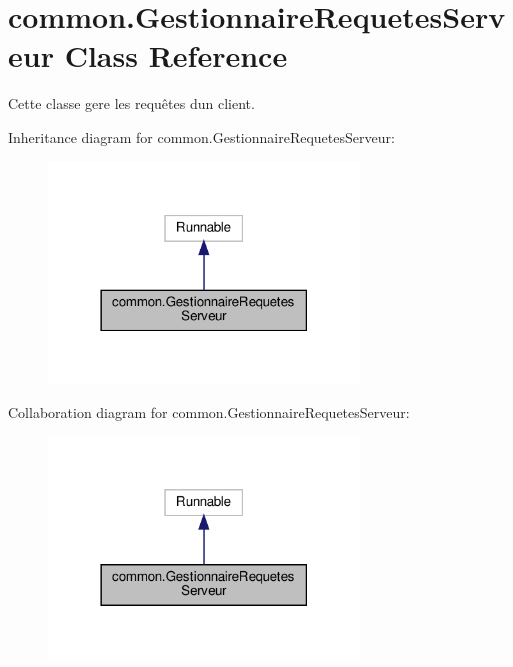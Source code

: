 \hypertarget{classcommon_1_1GestionnaireRequetesServeur}{}\section{common.\+Gestionnaire\+Requetes\+Serveur Class Reference}
\label{classcommon_1_1GestionnaireRequetesServeur}


Cette classe gere les requêtes d\textquotesingle{}un client.  




Inheritance diagram for common.\+Gestionnaire\+Requetes\+Serveur\+:
\nopagebreak
\begin{figure}[H]
\begin{center}
\leavevmode
\includegraphics[width=234pt]{classcommon_1_1GestionnaireRequetesServeur__inherit__graph}
\end{center}
\end{figure}


Collaboration diagram for common.\+Gestionnaire\+Requetes\+Serveur\+:
\nopagebreak
\begin{figure}[H]
\begin{center}
\leavevmode
\includegraphics[width=234pt]{classcommon_1_1GestionnaireRequetesServeur__coll__graph}
\end{center}
\end{figure}
